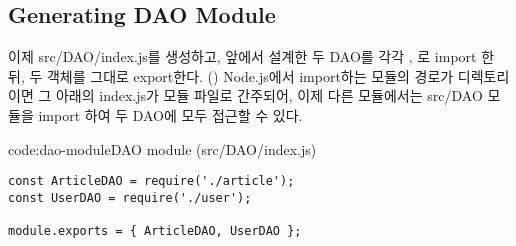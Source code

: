 \subsection*{Generating DAO Module}

이제 src/DAO/index.js를 생성하고, 앞에서 설계한 두 DAO를 각각 , 로 import 한 뒤, 두 객체를 그대로 export한다. () Node.js에서 import하는 모듈의 경로가 디렉토리이면 그 아래의 index.js가 모듈 파일로 간주되어, 이제 다른 모듈에서는 src/DAO 모듈을 import 하여 두 DAO에 모두 접근할 수 있다.

\begin{code}{code:dao-module}{DAO module (src/DAO/index.js)}
\begin{verbatim}
const ArticleDAO = require('./article');
const UserDAO = require('./user');

module.exports = { ArticleDAO, UserDAO };
\end{verbatim}
\end{code}

